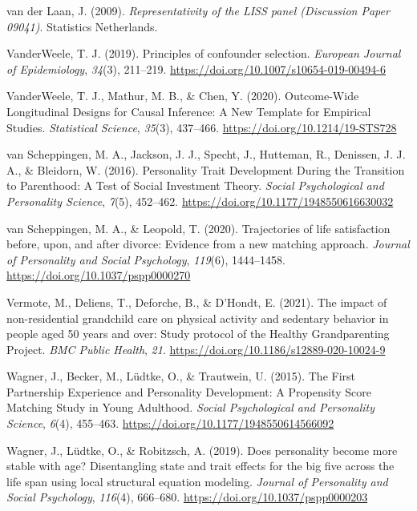 \documentclass[
  english,
  man, noextraspace]{apa7}
\begin{document}
\leavevmode\hypertarget{ref-vanderlaanRepresentativityLISSPanel2009}{}%
van der Laan, J. (2009). \emph{Representativity of the LISS panel (Discussion Paper 09041)}. Statistics Netherlands.

\leavevmode\hypertarget{ref-vanderweelePrinciplesConfounderSelection2019}{}%
VanderWeele, T. J. (2019). Principles of confounder selection. \emph{European Journal of Epidemiology}, \emph{34}(3), 211--219. \url{https://doi.org/10.1007/s10654-019-00494-6}

\leavevmode\hypertarget{ref-vanderweeleOutcomeWideLongitudinalDesigns2020}{}%
VanderWeele, T. J., Mathur, M. B., \& Chen, Y. (2020). Outcome-Wide Longitudinal Designs for Causal Inference: A New Template for Empirical Studies. \emph{Statistical Science}, \emph{35}(3), 437--466. \url{https://doi.org/10.1214/19-STS728}

\leavevmode\hypertarget{ref-vanscheppingenPersonalityTraitDevelopment2016}{}%
van Scheppingen, M. A., Jackson, J. J., Specht, J., Hutteman, R., Denissen, J. J. A., \& Bleidorn, W. (2016). Personality Trait Development During the Transition to Parenthood: A Test of Social Investment Theory. \emph{Social Psychological and Personality Science}, \emph{7}(5), 452--462. \url{https://doi.org/10.1177/1948550616630032}

\leavevmode\hypertarget{ref-vanscheppingenTrajectoriesLifeSatisfaction2020}{}%
van Scheppingen, M. A., \& Leopold, T. (2020). Trajectories of life satisfaction before, upon, and after divorce: Evidence from a new matching approach. \emph{Journal of Personality and Social Psychology}, \emph{119}(6), 1444--1458. \url{https://doi.org/10.1037/pspp0000270}

\leavevmode\hypertarget{ref-vermoteImpactNonresidentialGrandchild2021a}{}%
Vermote, M., Deliens, T., Deforche, B., \& D'Hondt, E. (2021). The impact of non-residential grandchild care on physical activity and sedentary behavior in people aged 50 years and over: Study protocol of the Healthy Grandparenting Project. \emph{BMC Public Health}, \emph{21}. \url{https://doi.org/10.1186/s12889-020-10024-9}

\leavevmode\hypertarget{ref-wagnerFirstPartnershipExperience2015}{}%
Wagner, J., Becker, M., Lüdtke, O., \& Trautwein, U. (2015). The First Partnership Experience and Personality Development: A Propensity Score Matching Study in Young Adulthood. \emph{Social Psychological and Personality Science}, \emph{6}(4), 455--463. \url{https://doi.org/10.1177/1948550614566092}

\leavevmode\hypertarget{ref-wagnerDoesPersonalityBecome2019}{}%
Wagner, J., Lüdtke, O., \& Robitzsch, A. (2019). Does personality become more stable with age? Disentangling state and trait effects for the big five across the life span using local structural equation modeling. \emph{Journal of Personality and Social Psychology}, \emph{116}(4), 666--680. \url{https://doi.org/10.1037/pspp0000203}
\end{document}
